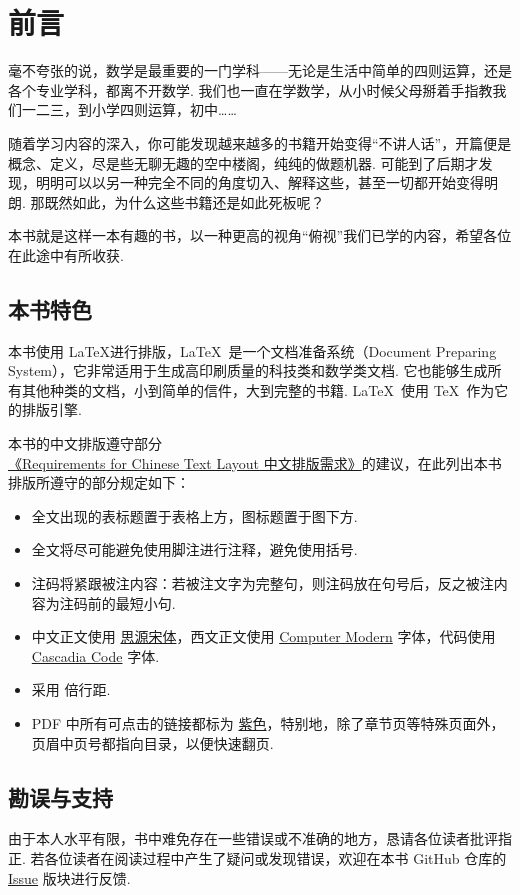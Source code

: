\chapter{前言}

毫不夸张的说，数学是最重要的一门学科——无论是生活中简单的四则运算，还是各个专业学科，都离不开数学. 我们也一直在学数学，从小时候父母掰着手指教我们一二三，到小学四则运算，初中……

随着学习内容的深入，你可能发现越来越多的书籍开始变得“不讲人话”，开篇便是概念、定义，尽是些无聊无趣的空中楼阁，纯纯的做题机器. 可能到了后期才发现，明明可以以另一种完全不同的角度切入、解释这些，甚至一切都开始变得明朗. 那既然如此，为什么这些书籍还是如此死板呢？

本书就是这样一本有趣的书，以一种更高的视角“俯视”我们已学的内容，希望各位在此途中有所收获.

\section*{本书特色}

本书使用 \LaTeX 进行排版，\LaTeX\ 是一个文档准备系统（Document Preparing System），它非常适用于生成高印刷质量的科技类和数学类文档. 它也能够生成所有其他种类的文档，小到简单的信件，大到完整的书籍. \LaTeX\ 使用 \TeX\ 作为它的排版引擎. \cite{lshort}

本书的中文排版遵守部分\href{https://w3c.github.io/clreq}{《Requirements for Chinese Text Layout 中文排版需求》}的建议，在此列出本书排版所遵守的部分规定如下：

\begin{itemize}
  \item 全文出现的表标题置于表格上方，图标题置于图下方.
  \item 全文将尽可能避免使用脚注进行注释，避免使用括号.
  \item 注码将紧跟被注内容：若被注文字为完整句，则注码放在句号后，反之被注内容为注码前的最短小句.
  \item 中文正文使用 \href{https://github.com/adobe-fonts/source-han-serif}{思源宋体}，西文正文使用 \href{https://en.wikipedia.org/wiki/Computer_Modern}{Computer Modern} 字体，代码使用 \href{https://github.com/microsoft/cascadia-code}{Cascadia Code} 字体.
  \item 采用  倍行距.
  \item PDF 中所有可点击的链接都标为 \href{https://www.color-hex.com/color/c678dd}{紫色}，特别地，除了章节页等特殊页面外，页眉中页号都指向目录，以便快速翻页.
\end{itemize}

\section*{勘误与支持}

由于本人水平有限，书中难免存在一些错误或不准确的地方，恳请各位读者批评指正. 若各位读者在阅读过程中产生了疑问或发现错误，欢迎在本书 GitHub 仓库的 \href{https://github.com/Cierra-Runis/math/issues}{Issue} 版块进行反馈.

\begin{flushright}
  \href{https://github.com/Cierra-Runis}{\creator} \\
  \latestdate
\end{flushright}
